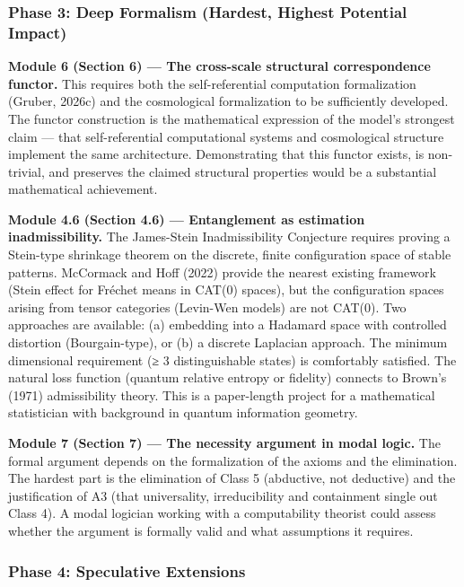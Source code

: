 \documentclass[
]{article}
\begin{document}
\hypertarget{phase-3-deep-formalism-hardest-highest-potential-impact}{%
\subsubsection{Phase 3: Deep Formalism (Hardest, Highest Potential
Impact)}\label{phase-3-deep-formalism-hardest-highest-potential-impact}}

\textbf{Module 6 (Section 6) --- The cross-scale structural
correspondence functor.} This requires both the self-referential
computation formalization (Gruber, 2026c) and the cosmological
formalization to be sufficiently developed. The functor construction is
the mathematical expression of the model's strongest claim --- that
self-referential computational systems and cosmological structure
implement the same architecture. Demonstrating that this functor exists,
is non-trivial, and preserves the claimed structural properties would be
a substantial mathematical achievement.

\textbf{Module 4.6 (Section 4.6) --- Entanglement as estimation
inadmissibility.} The James-Stein Inadmissibility Conjecture requires
proving a Stein-type shrinkage theorem on the discrete, finite
configuration space of stable patterns. McCormack and Hoff (2022)
provide the nearest existing framework (Stein effect for Fréchet means
in CAT(0) spaces), but the configuration spaces arising from tensor
categories (Levin-Wen models) are not CAT(0). Two approaches are
available: (a) embedding into a Hadamard space with controlled
distortion (Bourgain-type), or (b) a discrete Laplacian approach. The
minimum dimensional requirement (≥ 3 distinguishable states) is
comfortably satisfied. The natural loss function (quantum relative
entropy or fidelity) connects to Brown's (1971) admissibility theory.
This is a paper-length project for a mathematical statistician with
background in quantum information geometry.

\textbf{Module 7 (Section 7) --- The necessity argument in modal logic.}
The formal argument depends on the formalization of the axioms and the
elimination. The hardest part is the elimination of Class 5 (abductive,
not deductive) and the justification of A3 (that universality,
irreducibility and containment single out Class 4). A modal logician
working with a computability theorist could assess whether the argument
is formally valid and what assumptions it requires.

\hypertarget{phase-4-speculative-extensions}{%
\subsubsection{Phase 4: Speculative
Extensions}\label{phase-4-speculative-extensions}}
\end{document}

